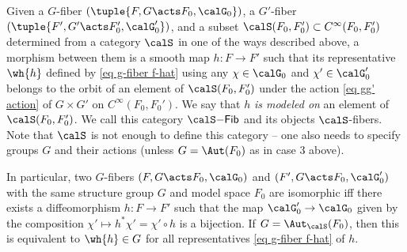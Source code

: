 \begin{defn}\label{def S-fibers}
    Given a $G$-fiber $(\tuple{F,G\acts F_0,\calG_0})$, a $G'$-fiber $(\tuple{F',G'\acts F_0',\calG_0'})$, and a subset $\calS(F_0,F_0')\subset C^\infty(F_0,F_0')$ determined from a category $\calS$ in one of the ways described above, a morphism between them is a smooth map $h: F\to F'$ such that its representative $\wh{h}$ defined by \eqref{eq g-fiber f-hat} using any $\chi\in\calG_0$ and $\chi'\in\calG_0'$ belongs to the orbit of an element of $\calS(F_0,F_0')$ under the action \eqref{eq gg' action} of $G\times G'$ on $C^\infty(F_0,F_0')$. We say that $h$ \emph{is modeled on} an element of $\calS(F_0,F_0')$. We call this category $\calS\mathsf{-Fib}$ and its objects $\calS$-fibers. Note that $\calS$ is not enough to define this category -- one also needs to specify groups $G$ and their actions (unless $G=\Aut(F_0)$ as in case 3 above).

    In particular, two $G$-fibers $(F,G\acts F_0,\calG_0)$ and $(F',G\acts F_0,\calG_0')$ with the same structure group $G$ and model space $F_0$ are isomorphic iff there exists a diffeomorphism $h:F\to F'$ such that the map $\calG_0'\to \calG_0$ given by the composition $\chi'\mapsto h^\ast \chi'=\chi'\circ h$ is a bijection. If $G=\Aut_\calS(F_0)$, then this is equivalent to $\wh{h}\in G$ for all representatives \eqref{eq g-fiber f-hat} of $h$.
\end{defn}

